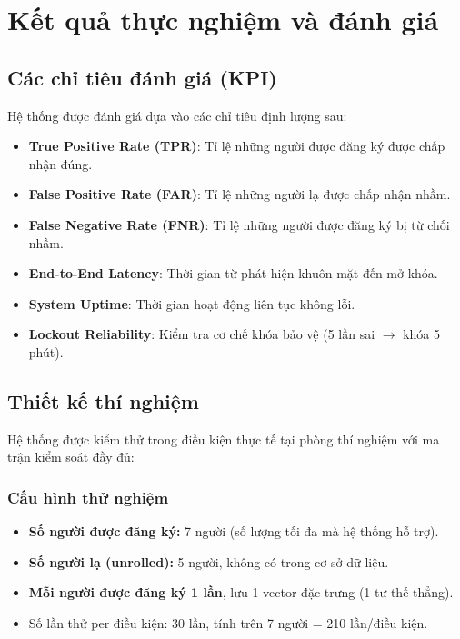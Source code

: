 \chapter{Kết quả thực nghiệm và đánh giá}
\label{chap:results}

\section{Các chỉ tiêu đánh giá (KPI)}
\label{sec:kpi}

Hệ thống được đánh giá dựa vào các chỉ tiêu định lượng sau:
\begin{itemize}
  \item \textbf{True Positive Rate (TPR)}: Tỉ lệ những người được đăng ký được chấp nhận đúng.
  \item \textbf{False Positive Rate (FAR)}: Tỉ lệ những người lạ được chấp nhận nhầm.
  \item \textbf{False Negative Rate (FNR)}: Tỉ lệ những người được đăng ký bị từ chối nhầm.
  \item \textbf{End-to-End Latency}: Thời gian từ phát hiện khuôn mặt đến mở khóa.
  \item \textbf{System Uptime}: Thời gian hoạt động liên tục không lỗi.
  \item \textbf{Lockout Reliability}: Kiểm tra cơ chế khóa bảo vệ (5 lần sai $\to$ khóa 5 phút).
\end{itemize}

\section{Thiết kế thí nghiệm}
\label{sec:test_design}

Hệ thống được kiểm thử trong điều kiện thực tế tại phòng thí nghiệm với ma trận kiểm soát đầy đủ:

\subsection{Cấu hình thử nghiệm}
\begin{itemize}
  \item \textbf{Số người được đăng ký:} 7 người (số lượng tối đa mà hệ thống hỗ trợ).
  \item \textbf{Số người lạ (unrolled):} 5 người, không có trong cơ sở dữ liệu.
  \item \textbf{Mỗi người được đăng ký 1 lần}, lưu 1 vector đặc trưng (1 tư thế thẳng).
  \item Số lần thử per điều kiện: 30 lần, tính trên 7 người = 210 lần/điều kiện.
\end{itemize}

